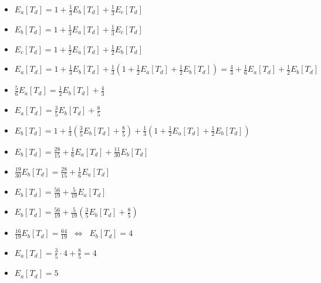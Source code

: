 \documentclass[12pt]{article}
\begin{document}
\begin{itemize}
    \item $E_a[T_d] = 1 + \frac{1}{3}E_b[T_d] + \frac{1}{3}E_c[T_d]$
    \item $E_b[T_d] = 1 + \frac{1}{3}E_a[T_d] + \frac{1}{3}E_c[T_d]$
    \item $E_c[T_d] = 1 + \frac{1}{2}E_a[T_d] + \frac{1}{2}E_b[T_d]$\\
    
    \item $E_a[T_d] = 1 + \frac{1}{3}E_b[T_d] + \frac{1}{3}\left(1 + \frac{1}{2}E_a[T_d] + \frac{1}{2}E_b[T_d]\right)
    =\frac{4}{3} + \frac{1}{6}E_a[T_d] +\frac{1}{2}E_b[T_d]
    $
    \item $\frac{5}{6}E_a[T_d] = \frac{1}{2}E_b[T_d] + \frac{4}{3}$
    \item $E_a[T_d] =  \frac{3}{5}E_b[T_d] + \frac{8}{5}$\\
    
    \item  $E_b[T_d] = 1 + \frac{1}{3}\left(\frac{3}{5}E_b[T_d] + \frac{8}{5}
    \right)
    + \frac{1}{3}\left(1 + \frac{1}{2}E_a[T_d] + \frac{1}{2}E_b[T_d] \right)$
    
    \item $E_b[T_d] = \frac{28}{15}+\frac{1}{6}E_a[T_d] +\frac{11}{30}E_b[T_d]    $
    \item $\frac{19}{30}E_b[T_d] = \frac{28}{15}+\frac{1}{6}E_a[T_d]$
    \item $E_b[T_d] = \frac{56}{19}+\frac{5}{19}E_a[T_d]$\\
    
    \item $E_b[T_d] = \frac{56}{19}+\frac{5}{19}\left(\frac{3}{5}E_b[T_d] + \frac{8}{5}
    \right)$
    \item $\frac{16}{19}E_b[T_d] = \frac{64}{19} \;\; \Leftrightarrow \;\; E_b[T_d] = 4$\\
    
    \item $E_a[T_d] =  \frac{3}{5}\cdot 4 + \frac{8}{5} = 4$
    \item $E_a[T_d] = 5$
\end{itemize}
\end{document}
